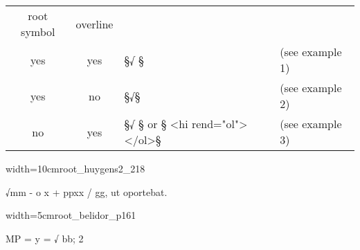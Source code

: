 \vspace{3mm}
\begin{tabelle}

\vspace{-1mm}
\begin{tabular}{@{}cc@{\qquad}l@{\qquad}l}
root symbol & overline & & \\[2mm]
yes & yes & §√{ }§ & (see example 1) \\[1mm]
yes & no & §√§ & (see example 2) \\[1mm]
no & yes & §√{ }§ or § <hi rend="ol"> </ol>§ & (see example 3) \\
\end{tabular}
\end{tabelle}

\vspace{7mm}
\begin{sampleImageSmall}{width=10cm}{root_huygens2_218}
\begin{typeLatin}
√mm - o x + \lwr ppxx / gg, ut oportebat.
\end{typeLatin}
\end{sampleImageSmall}

\vspace{3mm}
\begin{sampleImageSmall}{width=5cm}{root_belidor_p161}
\begin{typeLatin}
MP = y =  √ \bold{\{}bb;\bold{\}} \bold{/} 2 
\end{typeLatin}
\end{sampleImageSmall}



